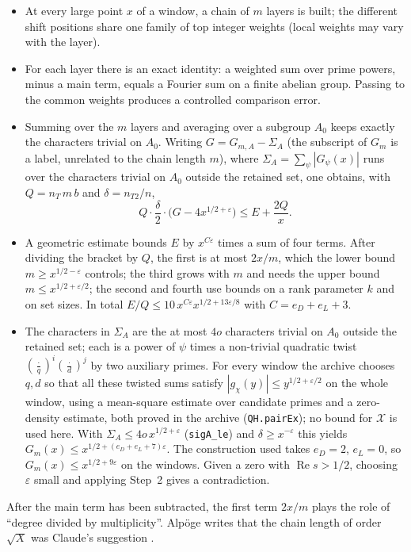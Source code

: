 \documentclass[11pt]{article}
\newcommand{\Lean}[1]{\texttt{\small #1}}
\renewcommand{\Re}{\operatorname{Re}}
\begin{document}
\begin{itemize}
\item At every large point $x$ of a window, a chain of $m$ layers is built; the different shift positions share one family of top integer weights (local weights may vary with the layer).
\item For each layer there is an exact identity: a weighted sum over prime powers, minus a main term, equals a Fourier sum on a finite abelian group. Passing to the common weights produces a controlled comparison error.
\item Summing over the $m$ layers and averaging over a subgroup $A_0$ keeps exactly the characters trivial on $A_0$. Writing $G=G_{m,A}-\Sigma_A$ (the subscript of $G_m$ is a label, unrelated to the chain length $m$), where $\Sigma_A=\sum_\psi|G_\psi(x)|$ runs over the characters trivial on $A_0$ outside the retained set, one obtains, with $Q=n_T\,m\,b$ and $\delta=n_{T2}/n$,
\[
Q\cdot\frac\delta2\cdot\bigl(G-4x^{1/2+\varepsilon}\bigr)\le E+\frac{2Q}{x}.
\]
\item A geometric estimate bounds $E$ by $x^{C\varepsilon}$ times a sum of four terms. After dividing the bracket by $Q$, the first is at most $2x/m$, which the lower bound $m\ge x^{1/2-\varepsilon}$ controls; the third grows with $m$ and needs the upper bound $m\le x^{1/2+\varepsilon/2}$; the second and fourth use bounds on a rank parameter $k$ and on set sizes. In total $E/Q\le 10\,x^{C\varepsilon}x^{1/2+13\varepsilon/8}$ with $C=e_D+e_L+3$.
\item The characters in $\Sigma_A$ are the at most $4o$ characters trivial on $A_0$ outside the retained set; each is a power of $\psi$ times a non-trivial quadratic twist $(\frac{\cdot}{q})^i(\frac{\cdot}{d})^j$ by two auxiliary primes. For every window the archive chooses $q,d$ so that all these twisted sums satisfy $|g_\chi(y)|\le y^{1/2+\varepsilon/2}$ on the whole window, using a mean-square estimate over candidate primes and a zero-density estimate, both proved in the archive (\Lean{QH.pairEx}); no bound for $\mathcal X$ is used here. With $\Sigma_A\le 4o\,x^{1/2+\varepsilon}$ (\Lean{sigA\_le}) and $\delta\ge x^{-\varepsilon}$ this yields $G_m(x)\le x^{1/2+(e_D+e_L+7)\varepsilon}$. The construction used takes $e_D=2$, $e_L=0$, so $G_m(x)\le x^{1/2+9\varepsilon}$ on the windows. Given a zero with $\Re s>1/2$, choosing $\varepsilon$ small and applying Step~2 gives a contradiction.
\end{itemize}

After the main term has been subtracted, the first term $2x/m$ plays the role of ``degree divided by multiplicity''. Alp\"oge writes that the chain length of order $\sqrt X$ was Claude's suggestion \cite{alpoge}.
\end{document}
